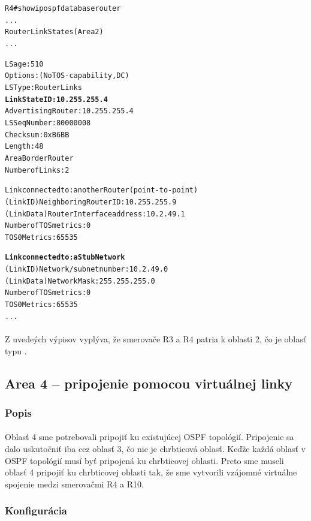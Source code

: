 \documentclass[12pt,twoside,a4paper]{report}
\begin{document}
\noindent
{\selectfont
\begin{small}
\begin{alltt}
R4#show ip ospf database router
...
		Router Link States (Area 2)
...

          
  LS age: 510
  Options: (No TOS-capability, DC)
  LS Type: Router Links
  \textbf{Link State ID: 10.255.255.4}
  Advertising Router: 10.255.255.4
  LS Seq Number: 80000008
  Checksum: 0xB6BB
  Length: 48
  Area Border Router
  Number of Links: 2

    Link connected to: another Router (point-to-point)
     (Link ID) Neighboring Router ID: 10.255.255.9
     (Link Data) Router Interface address: 10.2.49.1
      Number of TOS metrics: 0
       TOS 0 Metrics: 65535

    \textbf{Link connected to: a Stub Network}
     (Link ID) Network/subnet number: 10.2.49.0
     (Link Data) Network Mask: 255.255.255.0
      Number of TOS metrics: 0
       TOS 0 Metrics: 65535
...

\end{alltt}
\end{small}
}

\paragraph{}
Z uvedeých výpisov vyplýva, že smerovače R3 a R4 patria k oblasti 2, čo je oblasť typu .

\subsection{Area 4 – pripojenie pomocou virtuálnej linky}
\subsubsection{Popis}
\paragraph{}
Oblasť 4 sme potrebovali pripojiť ku existujúcej OSPF topológií. Pripojenie sa dalo uskutočniť iba cez oblasť 3, čo nie je chrbticová oblasť. Keďže každá oblasť v OSPF topológií musí byť pripojená ku chrbticovej oblasti. Preto sme museli oblasť 4 pripojiť ku chrbticovej oblasti tak, že sme vytvorili vzájomné virtuálne spojenie medzi smerovačmi R4 a R10.

\subsubsection{Konfigurácia}
\end{document}
